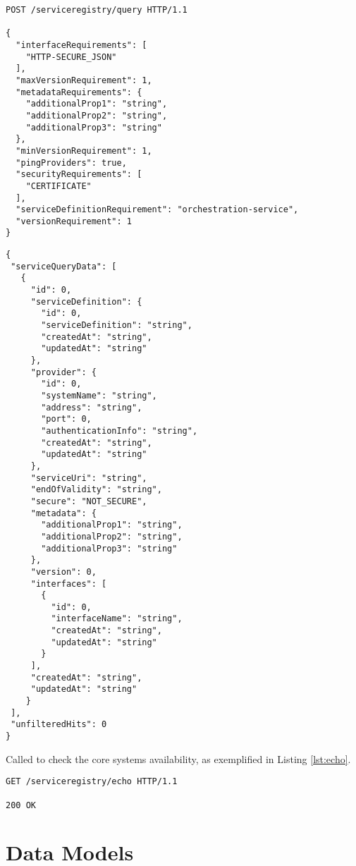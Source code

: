 \documentclass[a4paper]{arrowhead}
\newcommand{\oref}[1]{{\textcolor{ArrowheadBlue}{\hyperref[sec:operations:#1]{#1}}}}
\newcommand{\pref}[1]{{\textcolor{ArrowheadGrey}{\hyperref[sec:model:primitives:#1]{#1}}}}
\begin{document}
\begin{lstlisting}[language=http,label={lst:query},caption={A \oref{Query} invocation.}]
POST /serviceregistry/query HTTP/1.1

{
  "interfaceRequirements": [
    "HTTP-SECURE_JSON"
  ],
  "maxVersionRequirement": 1,
  "metadataRequirements": {
    "additionalProp1": "string",
    "additionalProp2": "string",
    "additionalProp3": "string"
  },
  "minVersionRequirement": 1,
  "pingProviders": true,
  "securityRequirements": [
    "CERTIFICATE"
  ],
  "serviceDefinitionRequirement": "orchestration-service",
  "versionRequirement": 1
}

\end{lstlisting}

\begin{lstlisting}[language=http,label={lst:query_response},caption={A \oref{Query} response. Every \pref{Object} contains an id.}]
{
 "serviceQueryData": [
   {
     "id": 0,
     "serviceDefinition": {
       "id": 0,
       "serviceDefinition": "string",
       "createdAt": "string",
       "updatedAt": "string"
     },
     "provider": {
       "id": 0,
       "systemName": "string",
       "address": "string",
       "port": 0,
       "authenticationInfo": "string",
       "createdAt": "string",
       "updatedAt": "string"
     },
     "serviceUri": "string",
     "endOfValidity": "string",
     "secure": "NOT_SECURE",
     "metadata": {
       "additionalProp1": "string",
       "additionalProp2": "string",
       "additionalProp3": "string"
     },
     "version": 0,
     "interfaces": [
       {
         "id": 0,
         "interfaceName": "string",
         "createdAt": "string",
         "updatedAt": "string"
       }
     ],
     "createdAt": "string",
     "updatedAt": "string"
    }
 ],
 "unfilteredHits": 0
}
\end{lstlisting}


Called to check the core systems availability, as exemplified in Listing \ref{lst:echo}.

\begin{lstlisting}[language=http,label={lst:echo},caption={An \oref{Echo} invocation response.}]
GET /serviceregistry/echo HTTP/1.1

200 OK

\end{lstlisting}
\color{black}


\newpage

\section{Data Models}
\label{sec:model}
\end{document}
